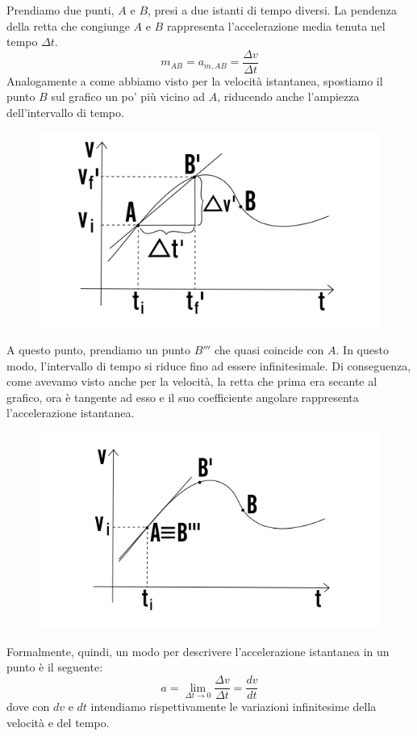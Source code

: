 \documentclass[11pt]{article}
\begin{document}
Prendiamo due punti, $A$ e $B$, presi a due istanti di tempo diversi. La pendenza della retta che congiunge $A$ e $B$ rappresenta l'accelerazione media tenuta nel tempo $\Delta t$.
\begin{equation*}
m_{AB} = a_{m,AB} = \dfrac{\Delta v}{\Delta t}
\end{equation*}
Analogamente a come abbiamo visto per la velocità istantanea, spostiamo il punto $B$ sul grafico un po' più vicino ad $A$, riducendo anche l'ampiezza dell'intervallo di tempo.
\begin{figure}[H]
\label{grafico2accIst}
\includegraphics[scale=0.7]{accIst_2.png}
\centering
\end{figure}
A questo punto, prendiamo un punto $B'''$ che quasi coincide con $A$. In questo modo, l'intervallo di tempo si riduce fino ad essere infinitesimale. Di conseguenza, come avevamo visto anche per la velocità, la retta che prima era secante al grafico, ora è tangente ad esso e il suo coefficiente angolare rappresenta l'accelerazione istantanea.
\begin{figure}[H]
\label{}
\includegraphics[scale=0.7]{accIst_3.png}
\centering
\end{figure}
Formalmente, quindi, un modo per descrivere l'accelerazione istantanea in un punto è il seguente:
\begin{equation}
a=\lim_{\Delta t \to 0} \dfrac{\Delta v}{\Delta t} = \dfrac{dv}{dt}
\end{equation}
dove con $dv$ e $dt$ intendiamo rispettivamente le variazioni infinitesime della velocità e del tempo.
\end{document}
